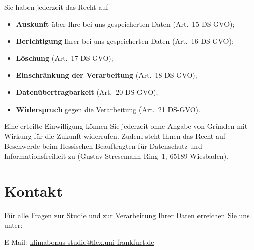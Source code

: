 \documentclass[11pt,a4paper,parskip=half,DIV=12]{scrartcl}
\begin{document}
Sie haben jederzeit das Recht auf

\begin{itemize}
  \item \textbf{Auskunft} über Ihre bei uns gespeicherten Daten (Art.~15 DS-GVO);
  \item \textbf{Berichtigung} Ihrer bei uns gespeicherten Daten (Art.~16 DS-GVO);
  \item \textbf{Löschung} (Art.~17 DS-GVO);
  \item \textbf{Einschränkung der Verarbeitung} (Art.~18 DS-GVO);
  \item \textbf{Datenübertragbarkeit} (Art.~20 DS-GVO);
  \item \textbf{Widerspruch} gegen die Verarbeitung (Art.~21 DS-GVO).
\end{itemize}

Eine erteilte Einwilligung können Sie jederzeit ohne Angabe von Gründen mit Wirkung für die Zukunft widerrufen. Zudem steht Ihnen das Recht auf Beschwerde beim Hessischen Beauftragten für Datenschutz und Informations\-freiheit zu (Gustav-Stresemann-Ring~1, 65189 Wiesbaden).

\section*{Kontakt}

Für alle Fragen zur Studie und zur Verarbeitung Ihrer Daten erreichen Sie uns unter:

E-Mail: \href{mailto:klimabonus-studie@flex.uni-frankfurt.de}{klimabonus-studie@flex.uni-frankfurt.de}
\end{document}
